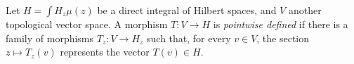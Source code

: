 \begin{definition}
 \label{definition-pointwise-defined}
Let $H=\int H_z \mu(z)$ be a direct integral of Hilbert spaces, and $V$ another topological vector space. A morphism $T: V\to H$ is {\it pointwise defined} if there is a family of morphisms $T_z: V\to H_z$ such that, for every $v\in V$, the section $z\mapsto T_z(v)$ represents the vector $T(v)\in H$. 
\end{definition}


















